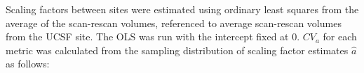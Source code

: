 Scaling factors between sites were estimated using ordinary least squares from the average of the scan-rescan volumes, referenced to average scan-rescan volumes from the UCSF site. The OLS was run with the intercept fixed at 0. $CV_a$ for each metric was calculated from the sampling distribution of scaling factor estimates $\hat{a}$ as follows: %